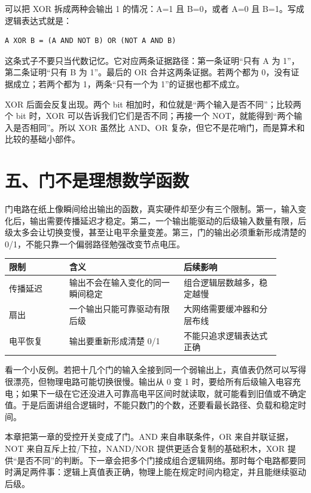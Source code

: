 可以把 XOR 拆成两种会输出 1 的情况：A=1 且 B=0，或者 A=0 且 B=1。写成逻辑表达式就是：

\begin{lstlisting}
A XOR B = (A AND NOT B) OR (NOT A AND B)
\end{lstlisting}

这条式子不要只当代数记忆。它对应两条证据路径：第一条证明“只有 A 为 1”，第二条证明“只有 B 为 1”。最后的 OR 合并这两条证据。若两个都为 0，没有证据成立；若两个都为 1，两条“只有一个为 1”的证据也都不成立。

XOR 后面会反复出现。两个 bit 相加时，和位就是“两个输入是否不同”；比较两个 bit 时，XOR 可以告诉我们它们是否不同；再接一个 NOT，就能得到“两个输入是否相同”。所以 XOR 虽然比 AND、OR 复杂，但它不是花哨门，而是算术和比较的基础小部件。

\section{五、门不是理想数学函数}

门电路在纸上像瞬间给出输出的函数，真实硬件却至少有三个限制。第一，输入变化后，输出需要传播延迟才稳定。第二，一个输出能驱动的后级输入数量有限，后级太多会让切换变慢，甚至让电平余量变差。第三，门的输出必须重新形成清楚的 0/1，不能只靠一个偏弱路径勉强改变节点电压。

\begin{longtable}{p{0.2\linewidth}p{0.38\linewidth}p{0.32\linewidth}}
\toprule
限制 & 含义 & 后续影响 \\
\midrule
传播延迟 & 输出不会在输入变化的同一瞬间稳定 & 组合逻辑层数越多，稳定越慢 \\
扇出 & 一个输出只能可靠驱动有限后级 & 大网络需要缓冲器和分层布线 \\
电平恢复 & 输出要重新形成清楚 0/1 & 不能只追求逻辑表达式正确 \\
\bottomrule
\end{longtable}

看一个小反例。若把十几个门的输入全接到同一个弱输出上，真值表仍然可以写得很漂亮，但物理电路可能切换很慢。输出从 0 变 1 时，要给所有后级输入电容充电；如果下一级在它还没进入可靠高电平区间时就读取，就可能看到旧值或不确定值。于是后面讲组合逻辑时，不能只数门的个数，还要看最长路径、负载和稳定时间。

本章把第一章的受控开关变成了门。AND 来自串联条件，OR 来自并联证据，NOT 来自互斥上拉/下拉，NAND/NOR 提供更适合复制的基础积木，XOR 提供“是否不同”的判断。下一章会把多个门接成组合逻辑网络。那时每个电路都要同时满足两件事：逻辑上真值表正确，物理上能在规定时间内稳定，并且能继续驱动后级。

